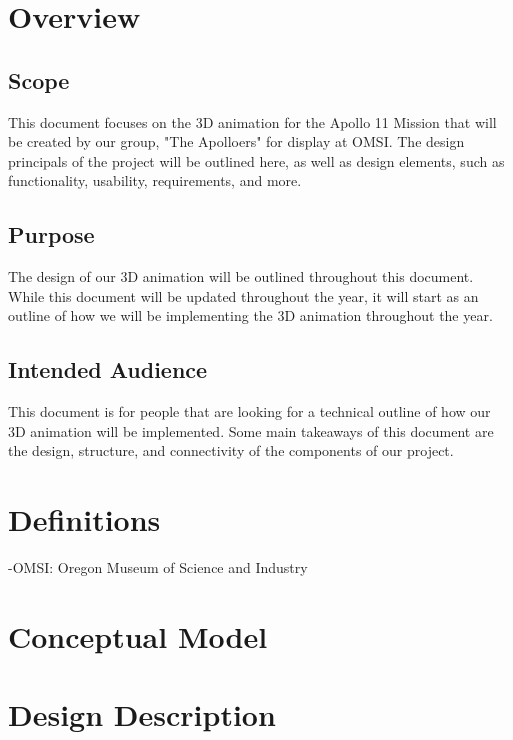 \documentclass[onecolumn, draftclsnofoot,10pt, compsoc]{IEEEtran}
\begin{document}
\clearpage


\section{Overview}
       \subsection{Scope}
        This document focuses on the 3D animation for the Apollo 11 Mission that will be created by our group, "The Apolloers" for display at OMSI. The design principals of the project will be outlined here, as well as design elements, such as functionality, usability, requirements, and more. 
        
    \subsection{Purpose}
        The design of our 3D animation will be outlined throughout this document. While this document will be updated throughout the year, it will start as an outline of how we will be implementing the 3D animation throughout the year. 

    \subsection{Intended Audience}
        This document is for people that are looking for a technical outline of how our 3D animation will be implemented. Some main takeaways of this document are the design, structure, and connectivity of the components of our project.

\section{Definitions}
-OMSI: Oregon Museum of Science and Industry
\section{Conceptual Model}
    \subsection{}

\section{Design Description}
\end{document}

